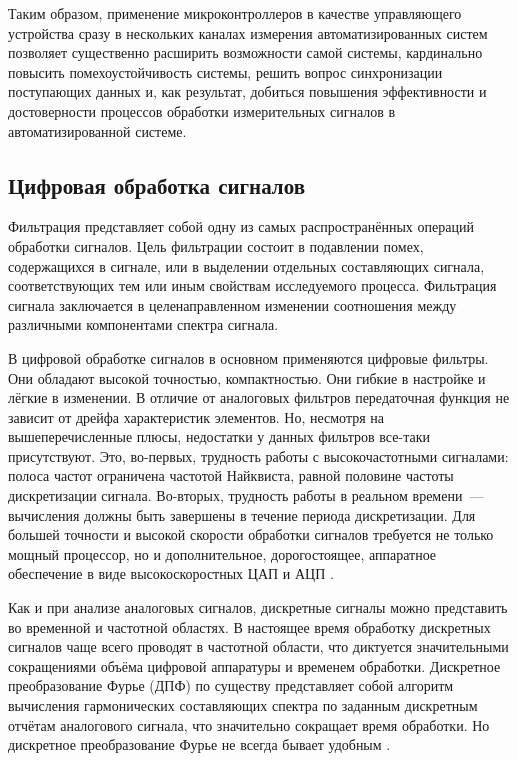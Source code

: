 \documentclass[a4paper, 14pt, titlepage]{extarticle}
\begin{document}
  Таким образом, применение микроконтроллеров в качестве управляющего устройства сразу в нескольких
  каналах измерения автоматизированных систем позволяет существенно расширить возможности самой
  системы, кардинально повысить помехоустойчивость системы, решить вопрос синхронизации поступающих
  данных и, как результат, добиться повышения эффективности и достоверности процессов обработки
  измерительных сигналов в автоматизированной системе.

  \subsection{Цифровая обработка сигналов}\label{ssec:signal-processing}

  Фильтрация представляет собой одну из самых распространённых операций обработки сигналов. Цель
  фильтрации состоит в подавлении помех, содержащихся в сигнале, или в выделении отдельных
  составляющих сигнала, соответствующих тем или иным свойствам исследуемого процесса. Фильтрация
  сигнала заключается в целенаправленном изменении соотношения между различными компонентами спектра
  сигнала.

  В цифровой обработке сигналов в основном применяются цифровые фильтры. Они обладают высокой
  точностью, компактностью. Они гибкие в настройке и лёгкие в изменении. В отличие от аналоговых
  фильтров передаточная функция не зависит от дрейфа характеристик элементов. Но, несмотря на
  вышеперечисленные плюсы, недостатки у данных фильтров все-таки присутствуют. Это, во-первых, трудность работы с
  высокочастотными сигналами: полоса частот ограничена частотой Найквиста, равной половине частоты
  дискретизации сигнала. Во-вторых, трудность работы в реальном времени~--- вычисления должны быть завершены в
  течение периода дискретизации. Для большей точности и высокой скорости обработки сигналов
  требуется не только мощный процессор, но и дополнительное, дорогостоящее, аппаратное обеспечение в
  виде высокоскоростных ЦАП и АЦП \cite{glinchenko-digital}.

  Как и при анализе аналоговых сигналов, дискретные сигналы можно представить во временной и
  частотной областях. В настоящее время обработку дискретных сигналов чаще всего проводят в
  частотной области, что диктуется значительными сокращениями объёма цифровой аппаратуры и временем
  обработки. Дискретное преобразование Фурье (ДПФ) по существу представляет собой алгоритм вычисления
  гармонических составляющих спектра по заданным дискретным отчётам аналогового сигнала, что
  значительно сокращает время обработки.  Но дискретное преобразование Фурье не всегда бывает
  удобным \cite{solonina-algorithms}.
\end{document}
